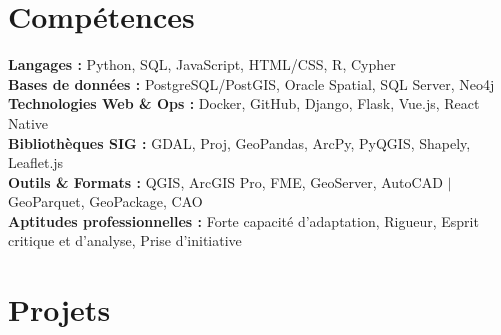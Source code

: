 \documentclass[11pt, a4paper]{article}
\begin{document}
\section*{Compétences}
\noindent \textbf{Langages :} Python, SQL, JavaScript, HTML/CSS, R, Cypher \\
\textbf{Bases de données :} PostgreSQL/PostGIS, Oracle Spatial, SQL Server, Neo4j \\
\textbf{Technologies Web \& Ops :} Docker, GitHub, Django, Flask, Vue.js, React Native \\
\textbf{Bibliothèques SIG :} GDAL, Proj, GeoPandas, ArcPy, PyQGIS, Shapely, Leaflet.js \\
\textbf{Outils \& Formats :} QGIS, ArcGIS Pro, FME, GeoServer, AutoCAD $\vert$ GeoParquet, GeoPackage, CAO \\
\textbf{Aptitudes professionnelles :} Forte capacité d’adaptation, Rigueur, Esprit critique et d'analyse, Prise d’initiative
\section*{Projets}
\end{document}
